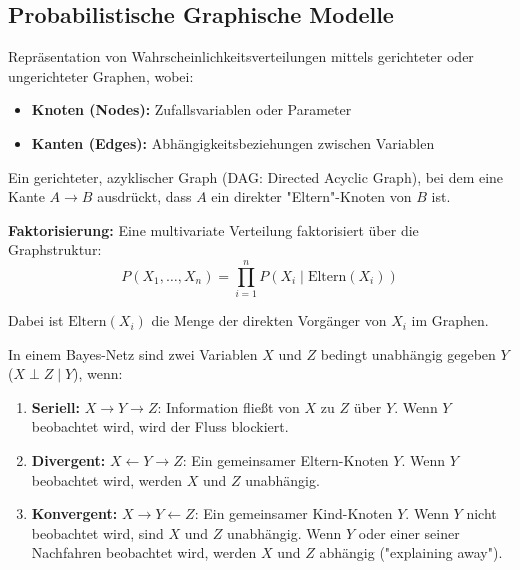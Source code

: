 \newpage

\subsection{Probabilistische Graphische Modelle}

Repräsentation von Wahrscheinlichkeitsverteilungen mittels gerichteter oder ungerichteter Graphen, wobei:
\begin{itemize}[leftmargin=1.5em]
    \item \textbf{Knoten (Nodes):} Zufallsvariablen oder Parameter
    \item \textbf{Kanten (Edges):} Abhängigkeitsbeziehungen zwischen Variablen
\end{itemize}

Ein gerichteter, azyklischer Graph (DAG: Directed Acyclic Graph), bei dem eine Kante $A \to B$ ausdrückt, dass $A$ ein direkter "Eltern"-Knoten von $B$ ist.

\textbf{Faktorisierung:} Eine multivariate Verteilung faktorisiert über die Graphstruktur:
$$P(X_1, \ldots, X_n) = \prod_{i=1}^{n} P(X_i \mid \text{Eltern}(X_i))$$

Dabei ist $\text{Eltern}(X_i)$ die Menge der direkten Vorgänger von $X_i$ im Graphen.


In einem Bayes-Netz sind zwei Variablen $X$ und $Z$ bedingt unabhängig gegeben $Y$ ($X \perp Z \mid Y$), wenn:
\begin{enumerate}[leftmargin=1.5em]
    \item \textbf{Seriell:} $X \to Y \to Z$: Information fließt von $X$ zu $Z$ über $Y$. Wenn $Y$ beobachtet wird, wird der Fluss blockiert.
    \item \textbf{Divergent:} $X \leftarrow Y \to Z$: Ein gemeinsamer Eltern-Knoten $Y$. Wenn $Y$ beobachtet wird, werden $X$ und $Z$ unabhängig.
    \item \textbf{Konvergent:} $X \to Y \leftarrow Z$: Ein gemeinsamer Kind-Knoten $Y$. Wenn $Y$ nicht beobachtet wird, sind $X$ und $Z$ unabhängig. Wenn $Y$ oder einer seiner Nachfahren beobachtet wird, werden $X$ und $Z$ abhängig ("explaining away").
\end{enumerate}

